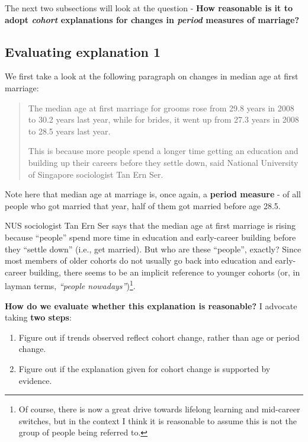 \documentclass[openany]{book}
\providecommand{\tightlist}{%
  \setlength{\itemsep}{0pt}\setlength{\parskip}{0pt}}
\let\rmarkdownfootnote\footnote%
\def\footnote{\protect\rmarkdownfootnote}
\begin{document}
The next two subsections will look at the question - \textbf{How
reasonable is it to adopt \emph{cohort} explanations for changes in
\emph{period} measures of marriage?}

\subsection{Evaluating explanation 1}\label{evaluating-explanation-1}

We first take a look at the following paragraph on changes in median age
at first marriage:

\begin{quote}
The median age at first marriage for grooms rose from 29.8 years in 2008
to 30.2 years last year, while for brides, it went up from 27.3 years in
2008 to 28.5 years last year.

This is because more people spend a longer time getting an education and
building up their careers before they settle down, said National
University of Singapore sociologist Tan Ern Ser.
\end{quote}

Note here that median age at marriage is, once again, a \textbf{period
measure} - of all people who got married that year, half of them got
married before age 28.5.

NUS sociologist Tan Ern Ser says that the median age at first marriage
is rising because ``people'' spend more time in education and
early-career building before they ``settle down'' (i.e., get married).
But who are these ``people'', exactly? Since most members of older
cohorts do not usually go back into education and early-career building,
there seems to be an implicit reference to younger cohorts (or, in
layman terms, \emph{``people nowadays''})\footnote{Of course, there is
  now a great drive towards lifelong learning and mid-career switches,
  but in the context I think it is reasonable to assume this is not the
  group of people being referred to.}.

\textbf{How do we evaluate whether this explanation is reasonable?} I
advocate taking \textbf{two steps}:

\begin{enumerate}
\def\labelenumi{\arabic{enumi}.}
\tightlist
\item
  Figure out if trends observed reflect cohort change, rather than age
  or period change.
\item
  Figure out if the explanation given for cohort change is supported by
  evidence.
\end{enumerate}
\end{document}
